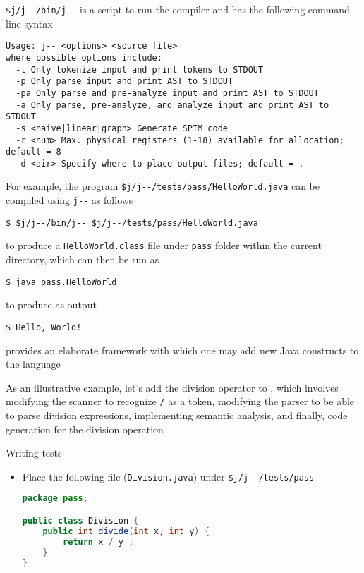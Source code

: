 \documentclass[8pt,a4paper,compress]{beamer}
\begin{document}
\begin{frame}[fragile]
\pause

\lstinline{$j/j--/bin/j--} is a script to run the compiler and has the following command-line
syntax
\begin{lstlisting}[language={}]
Usage: j-- <options> <source file>
where possible options include:
  -t Only tokenize input and print tokens to STDOUT
  -p Only parse input and print AST to STDOUT
  -pa Only parse and pre-analyze input and print AST to STDOUT
  -a Only parse, pre-analyze, and analyze input and print AST to STDOUT
  -s <naive|linear|graph> Generate SPIM code
  -r <num> Max. physical registers (1-18) available for allocation; default = 8
  -d <dir> Specify where to place output files; default = .
\end{lstlisting}

\pause
\bigskip

For example, the \jmm program \lstinline{$j/j--/tests/pass/HelloWorld.java} can be compiled
using \lstinline{j--} as follows

\begin{lstlisting}[language={}]
$ $j/j--/bin/j-- $j/j--/tests/pass/HelloWorld.java
\end{lstlisting}

to produce a \lstinline{HelloWorld.class} file under \lstinline{pass} folder within the current directory, which can then be run as

\begin{lstlisting}[language={}]
$ java pass.HelloWorld
\end{lstlisting}

to produce as output

\begin{lstlisting}[language={}]
$ Hello, World!
\end{lstlisting}
\end{frame}

\begin{frame}[fragile]
\pause

\jmm provides an elaborate framework with which one may add new Java constructs to the \jmm language

\pause
\bigskip

As an illustrative example, let's add the division operator to \jmm, which involves modifying the scanner to recognize \lstinline{/} as a token, modifying the parser to be able to parse division expressions, implementing semantic analysis, and finally, code generation for the division operation

\pause
\bigskip

Writing tests
\begin{itemize}
\item Place the following file (\lstinline{Division.java}) under \lstinline{$j/j--/tests/pass}

\begin{lstlisting}[language=Java]
package pass;

public class Division {
    public int divide(int x, int y) {
        return x / y ;
    }
}  
\end{lstlisting}
\end{itemize}
\end{frame}
\end{document}
